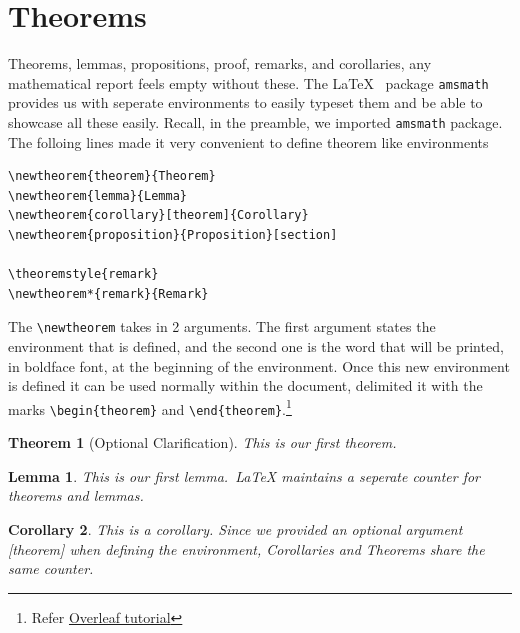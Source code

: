 \documentclass[12pt, letterpaper]{article}
\newtheorem{theorem}{Theorem}
\newtheorem{lemma}{Lemma}
\newtheorem{corollary}[theorem]{Corollary}
\theoremstyle{remark}
\begin{document}
\clearpage

\section{Theorems}

    Theorems, lemmas, propositions, proof, remarks, and corollaries, any mathematical report feels
    empty without these. The \LaTeX~ package \verb!amsmath! provides us with seperate environments to easily
    typeset them and be able to showcase all these easily. Recall, in the preamble, we imported \verb!amsmath!
    package. The folloing lines made it very convenient to define theorem like environments

\begin{lstlisting}
\newtheorem{theorem}{Theorem}
\newtheorem{lemma}{Lemma}
\newtheorem{corollary}[theorem]{Corollary}
\newtheorem{proposition}{Proposition}[section]

\theoremstyle{remark}
\newtheorem*{remark}{Remark}
\end{lstlisting}

    The \verb!\newtheorem! takes in 2 arguments. The first argument states the environment that is defined, and the
    second one is the word that will be printed, in boldface font, at the beginning of the environment.
    Once this new environment is defined it can be used normally within the document, 
    delimited it with the marks \verb!\begin{theorem}! and \verb!\end{theorem}!.\footnote{Refer \href{https://www.overleaf.com/learn/latex/theorems_and_proofs}{Overleaf tutorial}}

    \begin{theorem}[Optional Clarification]
    \label{firsttheorem}
        This is our first theorem.
    \end{theorem}

    \begin{lemma}
    \label{firstlemma}
        This is our first lemma.~\LaTeX{} maintains a seperate counter for theorems and lemmas.
    \end{lemma}

    \begin{corollary}
    \label{firstcorollary}
        This is a corollary. Since we provided an optional argument [theorem] when defining the environment,
        Corollaries and Theorems share the same counter.
    \end{corollary}
\end{document}
